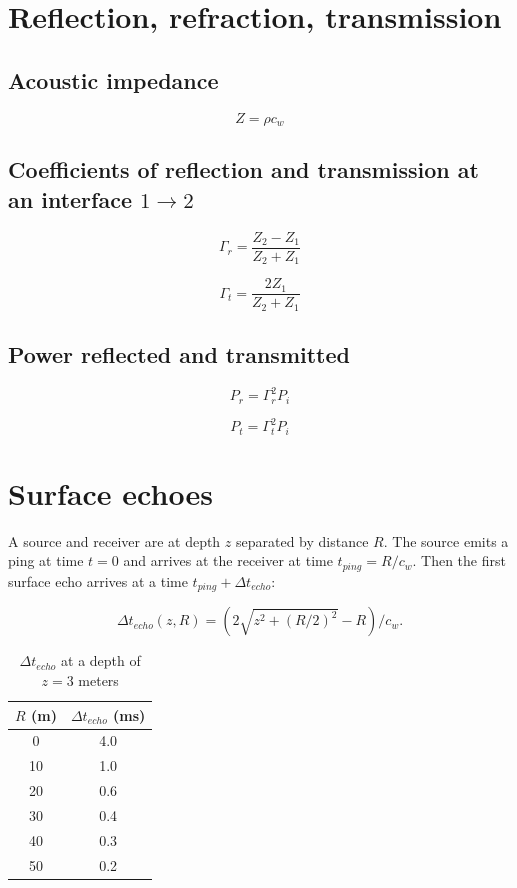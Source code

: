 \documentclass[10pt]{amsart}
\begin{document}
\section{Reflection, refraction, transmission}

\subsection{Acoustic impedance}

$$
Z = \rho c_w
$$

\subsection{Coefficients of reflection and transmission at an interface \(1 \rightarrow 2\)}

$$
\Gamma_{r} = \frac{Z_2 - Z_1}{Z_2 + Z_1}
$$

$$
\Gamma_{t} = \frac{2 Z_1}{Z_2 + Z_1}
$$

\subsection{Power reflected and transmitted}

$$
P_r = \Gamma_{r}^2 P_i
$$

$$
P_t = \Gamma_{t}^2 P_i
$$

\section{Surface echoes}


A source and receiver are at depth \(z\) separated by distance \(R\).  The source emits a ping at time \(t=0\) and arrives at the receiver at time \(t_{ping}=R/c_w\).  Then the first surface echo arrives at a time \(t_{ping}+\Delta{t}_{echo}\):


\begin{equation}
\Delta{t}_{echo}(z,R)=(2\sqrt{z^2+(R/2)^2}-R)/c_w.
\end{equation}


\begin{table}[h]
\caption{\(\Delta{t}_{echo}\) at a depth of \(z=3\) meters}
\begin{tabular}{|c|c|}
\hline\hline
\(R\) (m) & \(\Delta{t}_{echo}\) (ms) \\
\hline
 0	& 4.0 \\
 10	& 1.0 \\
 20	& 0.6 \\
 30	& 0.4 \\
 40	& 0.3 \\
 50	& 0.2 \\
 \hline
\end{tabular}
\label{tab:SurfaceEchoes}
\end{table}


\end{document}
